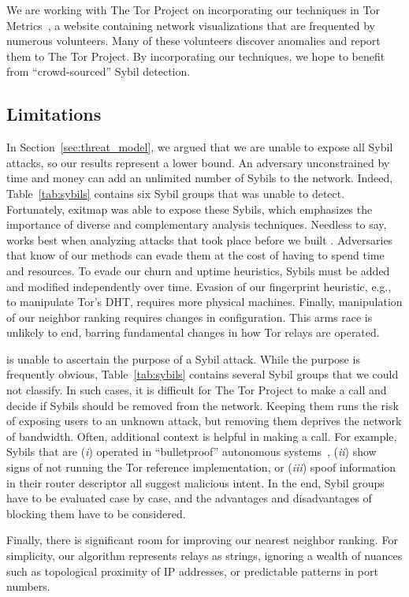 We are working with The Tor Project on incorporating our techniques in Tor
Metrics~\cite{metrics}, a website containing network visualizations that are
frequented by numerous volunteers.  Many of these volunteers discover anomalies
and report them to The Tor Project.  By incorporating our techniques, we hope
to benefit from ``crowd-sourced'' Sybil detection.

\subsection{Limitations}
\label{sec:limitations}
In Section~\ref{sec:threat_model}, we argued that we are unable to expose all
Sybil attacks, so our results represent a lower bound.  An adversary
unconstrained by time and money can add an unlimited number of Sybils to the
network.  Indeed, Table~\ref{tab:sybils} contains six Sybil groups that \sys was
unable to detect.  Fortunately, exitmap was able to expose these Sybils, which
emphasizes the importance of diverse and complementary analysis techniques.
Needless to say, \sys works best when analyzing attacks that took place before
we built \sys.  Adversaries that know of our methods can evade them at the cost
of having to spend time and resources.  To evade our churn and uptime
heuristics, Sybils must be added and modified independently over time.  Evasion
of our fingerprint heuristic, e.g., to manipulate Tor's DHT, requires more
physical machines.  Finally, manipulation of our neighbor ranking requires
changes in configuration.  This arms race is unlikely to end, barring
fundamental changes in how Tor relays are operated.

\Sys is unable to ascertain the purpose of a Sybil attack.  While the purpose
is frequently obvious, Table~\ref{tab:sybils} contains several Sybil groups
that we could not classify.  In such cases, it is difficult for The Tor Project
to make a call and decide if Sybils should be removed from the network.
Keeping them runs the risk of exposing users to an unknown attack, but removing
them deprives the network of bandwidth.  Often, additional context is helpful
in making a call.  For example, Sybils that are (\emph{i}) operated in
``bulletproof'' autonomous systems~\cite[\S~2]{Konte2015a}, (\emph{ii}) show
signs of not running the Tor reference implementation, or (\emph{iii}) spoof
information in their router descriptor all suggest malicious intent.  In the
end, Sybil groups have to be evaluated case by case, and the advantages and
disadvantages of blocking them have to be considered.

Finally, there is significant room for improving our nearest neighbor ranking.
For simplicity, our algorithm represents relays as strings, ignoring a wealth
of nuances such as topological proximity of IP addresses, or predictable
patterns in port numbers.
